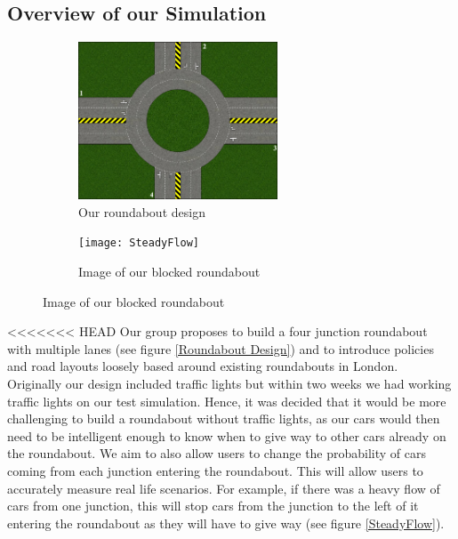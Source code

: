 \documentclass[11pt]{article}
\begin{document}
	\subsection{Overview of our Simulation}
	\begin{figure}
		\begin{subfigure}{.45\textwidth}
		\centering
		\includegraphics[width=0.65\textwidth]{Roundabout2}
		\caption{Our roundabout design}
		\label{RoundaboutDesign}
		\end{subfigure}
		\begin{subfigure}{.45\textwidth}
		\centering
		\texttt{[image: SteadyFlow]}
		\caption{Image of our blocked roundabout}
		\label{Steadyflow}
		\end{subfigure}
	\end{figure}
<<<<<<< HEAD
	Our group proposes to build a four junction roundabout with multiple lanes (see figure \ref{Roundabout Design}) and to introduce policies and road layouts loosely based around existing roundabouts in London. Originally our design included traffic lights but within two weeks we had working traffic lights on our test simulation. 
	Hence, it was decided that it would be more challenging to build a roundabout without traffic lights, as our cars would then need to be intelligent enough to know when to give way to other cars already on the roundabout. 
	We aim to also allow users to change the probability of cars coming from each junction entering the roundabout. 
	This will allow users to accurately measure real life scenarios. 
	For example, if there was a heavy flow of cars from one junction, this will stop cars from the junction to the left of it entering the roundabout as they will have to give way (see figure \ref{SteadyFlow}).
	
\end{document}
